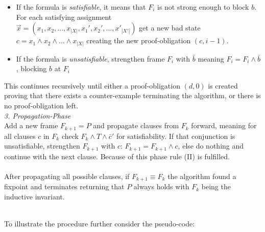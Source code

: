 \documentclass[11pt, a4paper, BCOR=10mm, ngerman]{scrbook}
\begin{document}
\begin{itemize}
\item If the formula is \textsl{satisfiable}, it means that $F_{i}$ is not strong enough to block $b$. For each satisfying assignment \\ $\vec{x} = (x_1, x_2, ..., x_{|X|}, x_1', x_2', ..., x'_{|X'|})$ get a new bad state \\ $c = x_1 \land x_2 \land ... \land x_{|X|}$ creating the new proof-obligation $(c, i-1)$.

\item If the formula is \textsl{unsatisfiable}, strengthen frame $F_{i}$ with $\bar b$ meaning $F_i = F_i \land \bar b$, blocking $b$ at $F_{i}$ 

\end{itemize}

This continues recursively until either a proof-obligation $(d, 0)$ is created proving that there exists a counter-example terminating the algorithm, or
there is no proof-obligation left. \\

\textsl{3. Propagation-Phase}\\ Add a new frame $F_{k + 1} = P$ and propagate clauses from $F_{k}$ forward, meaning for all clauses $c$ in $F_{k}$ check $F_{k} \land T \land \bar c'$ for satisfiability. If that conjunction is unsatisfiable, strengthen $F_{k+1}$ with $c$: $F_{k+1} = F_{k+1} \land c$, else do nothing and continue with the next clause. Because of this phase rule (II) is fulfilled.\\ \\
After propagating all possible clauses, if $F_{k+1} \equiv F_{k}$ the algorithm found a fixpoint and terminates returning that $P$ always holds with $F_k$ being the inductive invariant. \\ \\

\pagebreak

To illustrate the procedure further consider the pseudo-code: \\
\end{document}
